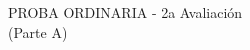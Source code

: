 %
\begin{center}
    \large{
    PROBA ORDINARIA - 2a Avaliación}\\
    \vspace*{0.35cm}
    \large (Parte A)
\end{center}
\vspace*{0.15cm}
